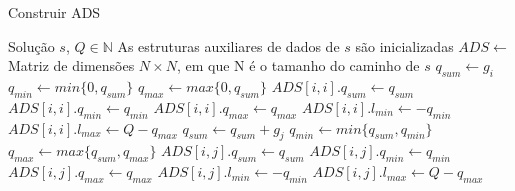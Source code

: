     \begin{algorithm}[H]
    \caption{Construir ADS}
    \begin{algorithmic}[1]
    \REQUIRE Solução $s$, $Q \in \mathbb{N}$
    \ENSURE As estruturas auxiliares de dados de $s$ são inicializadas
    \STATE $ADS \leftarrow$ Matriz de dimensões $N \times N$, em que N é o tamanho do caminho de $s$
        \STATE $q_{sum} \leftarrow g_i$
        \STATE $q_{min} \leftarrow min\{0, q_{sum}\}$
        \STATE $q_{max} \leftarrow max\{0, q_{sum}\}$
        \STATE $ADS[i, i].q_{sum} \leftarrow q_{sum}$
        \STATE $ADS[i, i].q_{min} \leftarrow q_{min}$
        \STATE $ADS[i, i].q_{max} \leftarrow q_{max}$
        \STATE $ADS[i, i].l_{min} \leftarrow -q_{min}$
        \STATE $ADS[i, i].l_{max} \leftarrow Q - q_{max}$
            \STATE $q_{sum} \leftarrow q_{sum} + g_j$
            \STATE $q_{min} \leftarrow min\{q_{sum}, q_{min}\}$
            \STATE $q_{max} \leftarrow max\{q_{sum}, q_{max}\}$
            \STATE $ADS[i, j].q_{sum} \leftarrow q_{sum}$
            \STATE $ADS[i, j].q_{min} \leftarrow q_{min}$
            \STATE $ADS[i, j].q_{max} \leftarrow q_{max}$
            \STATE $ADS[i, j].l_{min} \leftarrow -q_{min}$
            \STATE $ADS[i, j].l_{max} \leftarrow Q - q_{max}$
        \ENDFOR
    \ENDFOR
    \end{algorithmic}
    \end{algorithm}